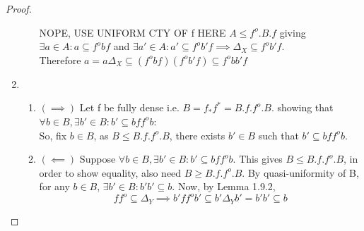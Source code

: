 \documentclass[18pt,a4paper]{article}
\theoremstyle{definition}
\begin{document}
\begin{proof}
\begin{enumerate}[label=(\alph*)]
\begin{enumerate}[label=(\roman*)]
						NOPE, USE UNIFORM CTY OF f HERE
						$A\leq f^o .B.f $
						giving\\ $\exists a \in A : a \subseteq f^o bf$ and
						$\exists a'\in A: a' \subseteq f^o b'f \implies \Delta_X \subseteq
						f^o b'	f$.\\
						Therefore $a=a\Delta_X \subseteq (f^o bf) (f^o b'f)
						\subseteq f^o bb'f$
				\end{enumerate}
			\item	\begin{enumerate}[label=(\roman*)]
				\item $(\implies )$ Let f be fully dense i.e. $B=f_*f^* = B.f.f^o.B$.
					showing that $\forall b \in B,\exists b'\in B: b'
					\subseteq bff^ob$:\\
					So, fix $b\in B$, as $B \leq B.f.f^o.B$, there exists $b' \in
					B$ such that $b' \subseteq bff^ob$.
				\item $(\impliedby)$ Suppose $\forall b \in B, \exists b' \in B:
					b' \subseteq bff^ob$. This gives $B\leq B.f.f^o .B$, in order
					to show equality, also need $B\geq B.f.f^o .B$.
					By quasi-uniformity of B, for any $b \in B$, $\exists b'\in B:b'b'
					\subseteq b$. Now, by Lemma 1.9.2,
					\[ f f^o \subseteq \Delta_Y \implies b'f f^o b' \subseteq b'
					\Delta_Y b'=b'b' \subseteq b\]


\end{enumerate}
\end{enumerate}
\end{proof}
\end{document}
